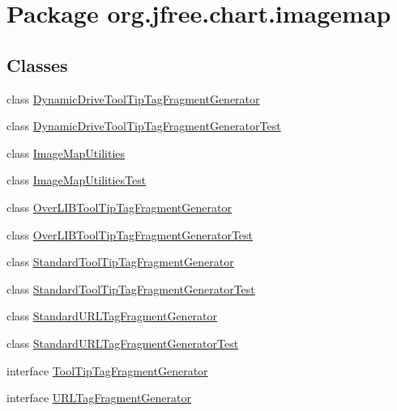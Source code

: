 \hypertarget{namespaceorg_1_1jfree_1_1chart_1_1imagemap}{}\section{Package org.\+jfree.\+chart.\+imagemap}
\label{namespaceorg_1_1jfree_1_1chart_1_1imagemap}
\subsection*{Classes}
\begin{DoxyCompactItemize}
\item 
class \mbox{\hyperlink{classorg_1_1jfree_1_1chart_1_1imagemap_1_1_dynamic_drive_tool_tip_tag_fragment_generator}{Dynamic\+Drive\+Tool\+Tip\+Tag\+Fragment\+Generator}}
\item 
class \mbox{\hyperlink{classorg_1_1jfree_1_1chart_1_1imagemap_1_1_dynamic_drive_tool_tip_tag_fragment_generator_test}{Dynamic\+Drive\+Tool\+Tip\+Tag\+Fragment\+Generator\+Test}}
\item 
class \mbox{\hyperlink{classorg_1_1jfree_1_1chart_1_1imagemap_1_1_image_map_utilities}{Image\+Map\+Utilities}}
\item 
class \mbox{\hyperlink{classorg_1_1jfree_1_1chart_1_1imagemap_1_1_image_map_utilities_test}{Image\+Map\+Utilities\+Test}}
\item 
class \mbox{\hyperlink{classorg_1_1jfree_1_1chart_1_1imagemap_1_1_over_l_i_b_tool_tip_tag_fragment_generator}{Over\+L\+I\+B\+Tool\+Tip\+Tag\+Fragment\+Generator}}
\item 
class \mbox{\hyperlink{classorg_1_1jfree_1_1chart_1_1imagemap_1_1_over_l_i_b_tool_tip_tag_fragment_generator_test}{Over\+L\+I\+B\+Tool\+Tip\+Tag\+Fragment\+Generator\+Test}}
\item 
class \mbox{\hyperlink{classorg_1_1jfree_1_1chart_1_1imagemap_1_1_standard_tool_tip_tag_fragment_generator}{Standard\+Tool\+Tip\+Tag\+Fragment\+Generator}}
\item 
class \mbox{\hyperlink{classorg_1_1jfree_1_1chart_1_1imagemap_1_1_standard_tool_tip_tag_fragment_generator_test}{Standard\+Tool\+Tip\+Tag\+Fragment\+Generator\+Test}}
\item 
class \mbox{\hyperlink{classorg_1_1jfree_1_1chart_1_1imagemap_1_1_standard_u_r_l_tag_fragment_generator}{Standard\+U\+R\+L\+Tag\+Fragment\+Generator}}
\item 
class \mbox{\hyperlink{classorg_1_1jfree_1_1chart_1_1imagemap_1_1_standard_u_r_l_tag_fragment_generator_test}{Standard\+U\+R\+L\+Tag\+Fragment\+Generator\+Test}}
\item 
interface \mbox{\hyperlink{interfaceorg_1_1jfree_1_1chart_1_1imagemap_1_1_tool_tip_tag_fragment_generator}{Tool\+Tip\+Tag\+Fragment\+Generator}}
\item 
interface \mbox{\hyperlink{interfaceorg_1_1jfree_1_1chart_1_1imagemap_1_1_u_r_l_tag_fragment_generator}{U\+R\+L\+Tag\+Fragment\+Generator}}
\end{DoxyCompactItemize}
